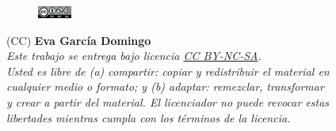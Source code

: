 
\vspace{5cm}

\begin{flushright}

\begin{figure}
\includegraphics[width=0.10\textwidth,right]{figs/by-nc-sa.png}
\end{figure}

\vspace{0.2cm}

{\tiny 
(CC) \textbf{Eva García Domingo}\\ %
\vspace{0.5cm}
\emph{
Este trabajo se entrega bajo licencia \href{https://creativecommons.org/licenses/by-nc-sa/3.0/es/}{CC BY-NC-SA}. \\
Usted es libre de \textit{(a) compartir}: copiar y redistribuir el material en \\
cualquier medio o formato; y \textit{(b) adaptar}: remezclar, transformar \\
y crear a partir del material. El licenciador no puede revocar estas \\
libertades mientras cumpla con los términos de la licencia. \\}
}

\end{flushright}

